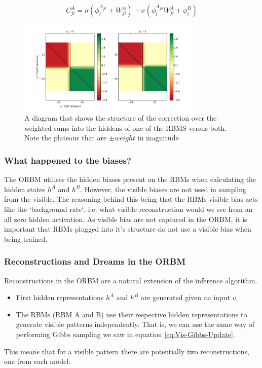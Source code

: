 \begin{equation}\label{eq:Approx-Correction}
 C^A_{ji} = \sigma(\phi^{A_{j0}}_i + W^A_{ji}) - \sigma(\phi^{A_{j0}}_i W^A_{ji} + \phi^B_i)
\end{equation}


\begin{figure}[h]
\begin{center}
  \includegraphics[width = 0.8\textwidth]{Assets/correction.png}
\caption{A diagram that shows the structure of the correction over the weighted sums into the hiddens of one of the RBMS versus both. Note the plateaus that are $\pm weight$ in magnitude}
\label{F:Correction-Plot}
\end{center}
\end{figure}

\subsubsection{What happened to the biases?}\label{S:Biases}

The ORBM utilises the hidden biases present on the RBMs when calculating the hidden states $h^A$ and $h^B$. However, the visible biases are not used in sampling from the visible. The reasoning behind this being that the RBMs visible bias acts like the `background rate`, i.e. what visible reconstruction would we see from an all zero hidden activation. As visible bias are not captured in the ORBM, it is important that RBMs plugged into it's structure do not use a visible bias when being trained.

\subsubsection{Reconstructions and Dreams in the ORBM}

Reconstructions in the ORBM are a natural extension of the inference algorithm.
\begin{itemize}
  \item First hidden representations $h^A$ and $ h^B $ are generated given an input $v$.
  \item The RBMs (RBM A and B) use their respective hidden representations to generate visible patterns independently. That is, we can use the same way of performing Gibbs sampling we saw in equation \ref{eq:Vis-Gibbs-Update}.
\end{itemize}
This means that for a visible pattern there are potentially two reconstructions, one from each model.
